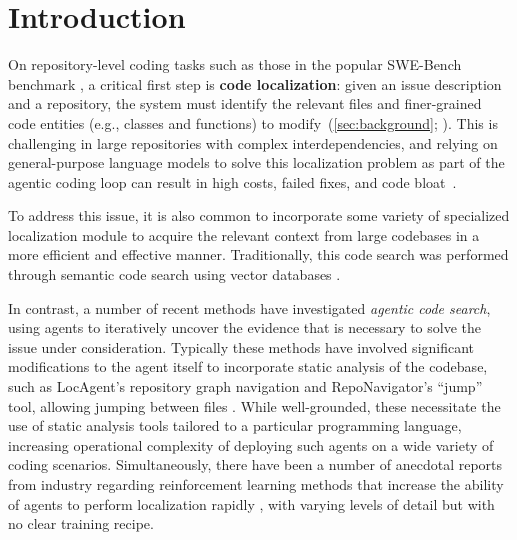 \section{Introduction}



On repository-level coding tasks such as those in the popular SWE-Bench benchmark \citep{jimenez2024swebenchlanguagemodelsresolve}, a critical first step is \textbf{code localization}: given an issue description and a repository, the system must identify the relevant files and finer-grained code entities (e.g., classes and functions) to modify~(\autoref{sec:background}; \citet{husain2019codesearchnet,xia2024agentless}).
This is challenging in large repositories with complex interdependencies, and relying on general-purpose language models to solve this localization problem as part of the agentic coding loop can result in high costs, failed fixes, and code bloat~\citep{hong2025context}.

To address this issue, it is also common to incorporate some variety of specialized localization module to acquire the relevant context from large codebases in a more efficient and effective manner.
Traditionally, this code search was performed through semantic code search using vector databases \citep{xia2024agentless,wang2025coderag,xie2025swe}.

In contrast, a number of recent methods have investigated \emph{agentic code search}, using agents to iteratively uncover the evidence that is necessary to solve the issue under consideration.
Typically these methods have involved significant modifications to the agent itself to incorporate static analysis of the codebase, such as LocAgent's repository graph navigation \citep{chen-etal-2025-locagent} and RepoNavigator's ``jump'' tool, allowing jumping between files \citep{zhang2025one}.
While well-grounded, these necessitate the use of static analysis tools tailored to a particular programming language, increasing operational complexity of deploying such agents on a wide variety of coding scenarios.
Simultaneously, there have been a number of anecdotal reports from industry regarding reinforcement learning methods that increase the ability of agents to perform localization rapidly \citep{cognition2025swegrep,cursor2025composer}, with varying levels of detail but with no clear training recipe.

